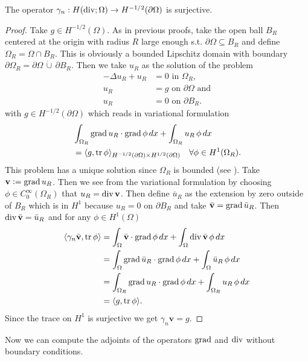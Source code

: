 \documentclass[../master_thesis.tex]{subfiles}
\begin{document}
\begin{theorem}
    The operator $\gamma_n: H(\operatorname{div}; \Omega) \rightarrow H^{-1/2}(\partial\Omega)$ 
    is surjective.
\end{theorem}
\begin{proof}
    Take $g \in H^{-1/2}(\Omega)$. As in previous proofs, take 
    the open ball $B_R$ centered at the origin with radius $R$ large enough 
    s.t. $\partial \Omega\subseteq B_R$ and define $\Omega_R = \Omega \cap B_R$.
    This is obviously a bounded Lipschitz domain with boundary 
    $\partial \Omega_R = \partial \Omega \, \dot{\cup} \,\partial B_R$.
    Then we take $u_R$ as the solution 
    of the problem 
    \begin{align*}
        -\Delta u_R + u_R &= 0 \text{ in $\Omega_R$}, \\
        u_R &= g \text{ on $\partial \Omega$ and} 
        \\ u_R &= 0 \text{ on $\partial B_R$.} 
    \end{align*}
    with $g \in H^{-1/2}(\partial \Omega)$ which reads in variational formulation
    \begin{align*}
        &\int_{\Omega_R} \operatorname{grad} u_R \cdot \operatorname{grad} \phi \, dx + \int_{\Omega_R} u_R \, \phi \,dx 
        \\ &= \langle g, \operatorname{tr} \phi \rangle_{H^{-1/2}(\partial \Omega) \times H^{1/2}(\partial \Omega)} \quad \forall \phi \in H^1(\Omega_R).
    \end{align*}
    This problem has a unique solution since $\Omega_R$ is bounded (see \cite[Thm. 3.12]{monk}).
    Take $\mathbf{v} \vcentcolon= \operatorname{grad} u_R$. Then we see from the variational 
    formulation by choosing $\phi \in C_0^\infty(\Omega_R)$ that $u_R = \operatorname{div} \mathbf{v}$.
    Then define $\bar{u}_R$ as the extension by zero outside of $B_R$ which is in $H^1$ 
    because $u_R = 0$ on $\partial B_R$ and take $\bar{\mathbf{v}} = \operatorname{grad} \bar{u}_R$. 
    Then $\operatorname{div} \bar{\mathbf{v}} = \bar{u}_R$
    and for any $\phi \in H^1(\Omega)$
    \begin{align*}
        \langle \gamma_n \bar{\mathbf{v}}, \operatorname{tr} \phi \rangle 
        &= \int_\Omega \bar{\mathbf{v}} \cdot \operatorname{grad} \phi \, dx 
            + \int_\Omega \operatorname{div} \bar{\mathbf{v}} \, \phi \, dx
        \\ &= \int_\Omega \operatorname{grad} \bar{u}_R \cdot \operatorname{grad} \phi \,dx
            + \int_\Omega \bar{u}_R \, \phi\, dx 
        \\ &= \int_{\Omega_R} \operatorname{grad} u_R \cdot \operatorname{grad} \phi\, dx
            + \int_{\Omega_R} u_R \, \phi \,dx 
        \\ &= \langle g, \operatorname{tr} \phi \rangle.
    \end{align*}
    Since the trace on $H^1$ is surjective we get $\gamma_n \mathbf{v} = g$.
\end{proof}
Now we can compute the adjoints of the operators $\operatorname{grad}$ and $\operatorname{div}$ without boundary conditions.
\end{document}
